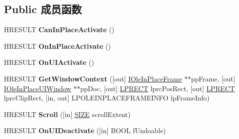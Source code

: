 \subsection*{Public 成员函数}
\begin{DoxyCompactItemize}
\item 
\mbox{\label{interface_i_ole_in_place_site_a53236d4a614045b7c0fd3d7e646c318f}} 
H\+R\+E\+S\+U\+LT {\bfseries Can\+In\+Place\+Activate} ()
\item 
\mbox{\label{interface_i_ole_in_place_site_a7e35c027e0f8750329bb277458b28ef1}} 
H\+R\+E\+S\+U\+LT {\bfseries On\+In\+Place\+Activate} ()
\item 
\mbox{\label{interface_i_ole_in_place_site_a830913d56596c911fc558e24968054d9}} 
H\+R\+E\+S\+U\+LT {\bfseries On\+U\+I\+Activate} ()
\item 
\mbox{\label{interface_i_ole_in_place_site_a55337ef2b805c00f860ee1becf60b7e2}} 
H\+R\+E\+S\+U\+LT {\bfseries Get\+Window\+Context} (\mbox{[}out\mbox{]} \hyperlink{interface_i_ole_in_place_frame}{I\+Ole\+In\+Place\+Frame} $\ast$$\ast$pp\+Frame, \mbox{[}out\mbox{]} \hyperlink{interface_i_ole_in_place_u_i_window}{I\+Ole\+In\+Place\+U\+I\+Window} $\ast$$\ast$pp\+Doc, \mbox{[}out\mbox{]} \hyperlink{structtag_r_e_c_t}{L\+P\+R\+E\+CT} lprc\+Pos\+Rect, \mbox{[}out\mbox{]} \hyperlink{structtag_r_e_c_t}{L\+P\+R\+E\+CT} lprc\+Clip\+Rect, \mbox{[}in, out\mbox{]} L\+P\+O\+L\+E\+I\+N\+P\+L\+A\+C\+E\+F\+R\+A\+M\+E\+I\+N\+FO lp\+Frame\+Info)
\item 
\mbox{\label{interface_i_ole_in_place_site_a6c78ab282e5fc18ff83f30c926fa9129}} 
H\+R\+E\+S\+U\+LT {\bfseries Scroll} (\mbox{[}in\mbox{]} \hyperlink{structtag_s_i_z_e}{S\+I\+ZE} scroll\+Extent)
\item 
\mbox{\label{interface_i_ole_in_place_site_a25f2afd5cd5b9e2edc51453cac97c5ea}} 
H\+R\+E\+S\+U\+LT {\bfseries On\+U\+I\+Deactivate} (\mbox{[}in\mbox{]} B\+O\+OL f\+Undoable)
\item 
\mbox{\label{interface_i_ole_in_place_site_ac3cd655bcd3d9c4c90859830b7f30eb2}} 

\end{DoxyCompactItemize}
